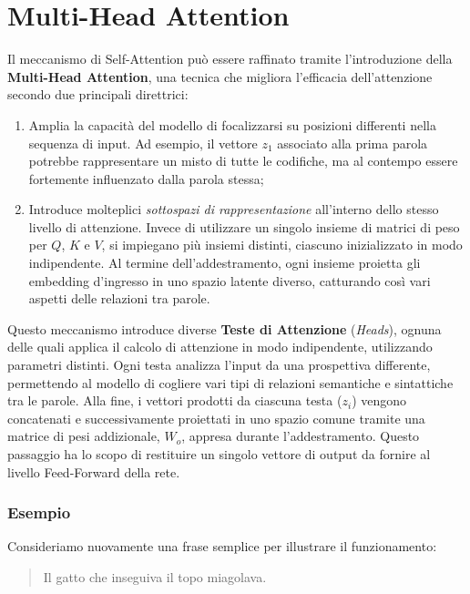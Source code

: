 \section{Multi-Head Attention}

Il meccanismo di Self-Attention può essere raffinato tramite l'introduzione della \textbf{Multi-Head Attention}, una tecnica che migliora l'efficacia dell'attenzione secondo due principali direttrici:

\begin{enumerate}
    \item Amplia la capacità del modello di focalizzarsi su posizioni differenti nella sequenza di input. Ad esempio, il vettore $z_1$ associato alla prima parola potrebbe rappresentare un misto di tutte le codifiche, ma al contempo essere fortemente influenzato dalla parola stessa;
    \item Introduce molteplici \textit{sottospazi di rappresentazione} all'interno dello stesso livello di attenzione. Invece di utilizzare un singolo insieme di matrici di peso per $Q$, $K$ e $V$, si impiegano più insiemi distinti, ciascuno inizializzato in modo indipendente. Al termine dell’addestramento, ogni insieme proietta gli embedding d’ingresso in uno spazio latente diverso, catturando così vari aspetti delle relazioni tra parole.
\end{enumerate}

Questo meccanismo introduce diverse \textbf{Teste di Attenzione} (\textit{Heads}), ognuna delle quali applica il calcolo di attenzione in modo indipendente, utilizzando parametri distinti. Ogni testa analizza l’input da una prospettiva differente, permettendo al modello di cogliere vari tipi di relazioni semantiche e sintattiche tra le parole. Alla fine, i vettori prodotti da ciascuna testa ($z_i$) vengono concatenati e successivamente proiettati in uno spazio comune tramite una matrice di pesi addizionale, $W_o$, appresa durante l’addestramento. Questo passaggio ha lo scopo di restituire un singolo vettore di output da fornire al livello Feed-Forward della rete.

\subsubsection{Esempio}

Consideriamo nuovamente una frase semplice per illustrare il funzionamento:

\begin{quote}
Il gatto che inseguiva il topo miagolava.
\end{quote}

